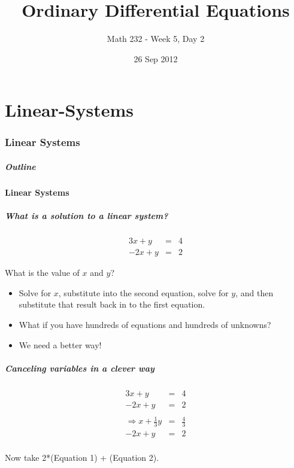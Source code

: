 \part{Linear-Systems}
\section{Linear Systems}

\title{Ordinary Differential Equations}
\subtitle{Math 232 - Week 5, Day 2}
\date{26 Sep 2012}

\begin{frame}
  \titlepage
\end{frame}

\begin{frame}
  \frametitle{Outline}
\end{frame}


\subsection{Linear Systems}


\begin{frame}
  \frametitle{What is a solution to a linear system?}

  \begin{eqnarray*}
    3x + y & = & 4 \\
    -2x + y & = & 2
  \end{eqnarray*}

  What is the value of $x$ and $y$?

  \begin{itemize}
  \item<3-> Solve for $x$, substitute into the second equation, solve
    for $y$, and then substitute that result back in to the first
    equation.
  \item<4-> What if you have hundreds of equations and hundreds of
    unknowns?
  \item<5-> We need a better way!
  \end{itemize}

\end{frame}


\begin{frame}
  \frametitle{Canceling variables in a clever way}

  \begin{eqnarray*}
    3x + y & = & 4 \\
    -2x + y & = & 2 \\
    \\
    \Rightarrow
    x + \frac{1}{3}y & = & \frac{4}{3} \\
    -2x + y & = & 2 \\    
  \end{eqnarray*}
  
  Now take 2*(Equation 1) + (Equation 2).

\end{frame}


